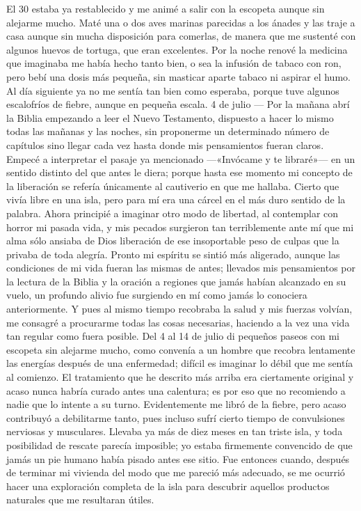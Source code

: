 \documentclass{novela}
\begin{document}
    El 30 estaba ya restablecido y me animé a salir con la escopeta aunque sin alejarme mucho. Maté una o dos aves marinas parecidas a los ánades y las traje a casa aunque sin mucha disposición para comerlas, de manera que me sustenté con algunos huevos de tortuga, que eran excelentes. Por la noche renové la medicina que imaginaba me había hecho tanto bien, o sea la infusión de tabaco con ron, pero bebí una dosis más pequeña, sin masticar aparte tabaco ni aspirar el humo. Al día siguiente ya no me sentía tan bien como esperaba, porque tuve algunos escalofríos de fiebre, aunque en pequeña escala.
    4 de julio — Por la mañana abrí la Biblia empezando a leer el Nuevo Testamento, dispuesto a hacer lo mismo todas las mañanas y las noches, sin proponerme un determinado número de capítulos sino llegar cada vez hasta donde mis pensamientos fueran claros.
    Empecé a interpretar el pasaje ya mencionado —«Invócame y te libraré»— en un sentido distinto del que antes le diera; porque hasta ese momento mi concepto de la liberación se refería únicamente al cautiverio en que me hallaba. Cierto que vivía libre en una isla, pero para mí era una cárcel en el más duro sentido de la palabra. Ahora principié a imaginar otro modo de libertad, al contemplar con horror mi pasada vida, y mis pecados surgieron tan terriblemente ante mí que mi alma sólo ansiaba de Dios liberación de ese insoportable peso de culpas que la privaba de toda alegría.
    Pronto mi espíritu se sintió más aligerado, aunque las condiciones de mi vida fueran las mismas de antes; llevados mis pensamientos por la lectura de la Biblia y la oración a regiones que jamás habían alcanzado en su vuelo, un profundo alivio fue surgiendo en mí como jamás lo conociera anteriormente. Y pues al mismo tiempo recobraba la salud y mis fuerzas volvían, me consagré a procurarme todas las cosas necesarias, haciendo a la vez una vida tan regular como fuera posible.
    Del 4 al 14 de julio di pequeños paseos con mi escopeta sin alejarme mucho, como convenía a un hombre que recobra lentamente las energías después de una enfermedad; difícil es imaginar lo débil que me sentía al comienzo. El tratamiento que he descrito más arriba era ciertamente original y acaso nunca habría curado antes una calentura; es por eso que no recomiendo a nadie que lo intente a su turno. Evidentemente me libró de la fiebre, pero acaso contribuyó a debilitarme tanto, pues incluso sufrí cierto tiempo de convulsiones nerviosas y musculares.
    Llevaba ya más de diez meses en tan triste isla, y toda posibilidad de rescate parecía imposible; yo estaba firmemente convencido de que jamás un pie humano había pisado antes ese sitio. Fue entonces cuando, después de terminar mi vivienda del modo que me pareció más adecuado, se me ocurrió hacer una exploración completa de la isla para descubrir aquellos productos naturales que me resultaran útiles.
\end{document}
